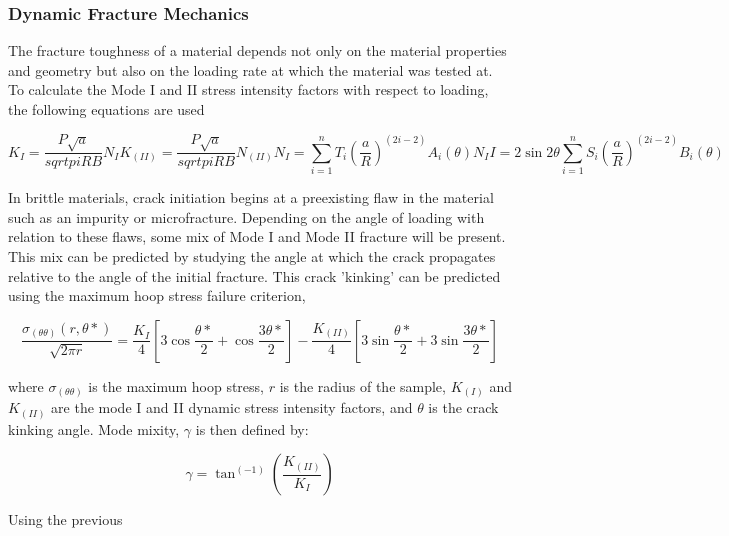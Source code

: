 \documentclass[12pt]{article}
\begin{document}
\subsubsection{Dynamic Fracture Mechanics} %

The fracture toughness of a material depends not only on the material properties and geometry but also on the loading rate at which the material was tested at. To calculate the Mode I and II stress intensity factors with respect to loading, the following equations are used

\begin{equation}
K_I = \frac{P\sqrt{a}}{sqrt{pi}RB}N_I

K_(II) = \frac{P\sqrt{a}}{sqrt{pi}RB}N_(II)

N_I = \displaystyle\sum_{i=1}^{n} T_i(\frac{a}{R})^(2i-2) A_i(\theta)

N_II = 2\sin2\theta\displaystyle\sum_{i=1}^{n} S_i(\frac{a}{R})^(2i-2) B_i(\theta)
\end{equation}

In brittle materials, crack initiation begins at a preexisting flaw in the material such as an impurity or microfracture. Depending on the angle of loading with relation to these flaws, some mix of Mode I and Mode II fracture will be present. This mix can be predicted by studying the angle at which the crack propagates relative to the angle of the initial fracture. This crack 'kinking' can be predicted using the maximum hoop stress failure criterion, 

\begin{equation}
\frac{\sigma_(\theta\theta)(r,\theta*)}{\sqrt{2\pi r}} = \frac{K_I}{4}[3\cos\frac{\theta*}{2}+\cos\frac{3\theta*}{2}]-\frac{K_(II)}{4}[3\sin\frac{\theta*}{2}+3\sin\frac{3\theta*}{2}]
\end{equation}

where $\sigma_(\theta\theta)$ is the maximum hoop stress, $r$ is the radius of the sample, $K_(I)$ and $K_(II)$ are the mode I and II dynamic stress intensity factors, and $\theta$ is the crack kinking angle. Mode mixity, $\gamma$ is then defined by:

\begin{equation}
\gamma = \tan^(-1)(\frac{K_(II)}{K_I})
\end{equation}

Using the previous
\end{document}
